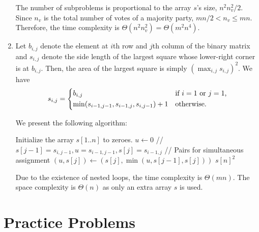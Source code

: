 \documentclass{article}
\begin{document}
\begin{enumerate}
    The number of subproblems is proportional to the array $s$'s size, $n^2n_v^2/2$. Since $n_v$ is the total number of votes of a majority party, $mn/2 < n_v \le mn$. Therefore, the time complexity is $\Theta(n^2n_v^2) = \Theta(m^2n^4)$.
    
    \item Let $b_{i, j}$ denote the element at $i$th row and $j$th column of the binary matrix and $s_{i, j}$ denote the side length of the largest square whose lower-right corner is at $b_{i, j}$. Then, the area of the largest square is simply $(\max_{i, j} s_{i, j})^2$. We have
    \[
        s_{i, j} = \begin{dcases*}
            b_{i, j} & if $i = 1$ or $j = 1$,\\
            \min(s_{i - 1, j - 1}, s_{i - 1, j}, s_{i, j - 1}) + 1 & otherwise.
        \end{dcases*}
    \]

    We present the following algorithm:
    \begin{algorithmic}[1]
        \State Initialize the array $s[1..n]$ to zeroes.
            \State $u \gets 0$
                \State // $s[j - 1] = s_{i, j - 1}, u = s_{i - 1, j - 1}, s[j] = s_{i - 1, j}$
                \State // Pairs for simultaneous assignment
                \State $(u, s[j]) \gets (s[j], \min(u, s[j - 1], s[j]))$
            \EndFor
        \EndFor
        \State \Return $s[n]^2$
    \end{algorithmic}

    Due to the existence of nested loops, the time complexity is $\Theta(mn)$. The space complexity is $\Theta(n)$ as only an extra array $s$ is used.
\end{enumerate}

\section{Practice Problems}
\end{document}
